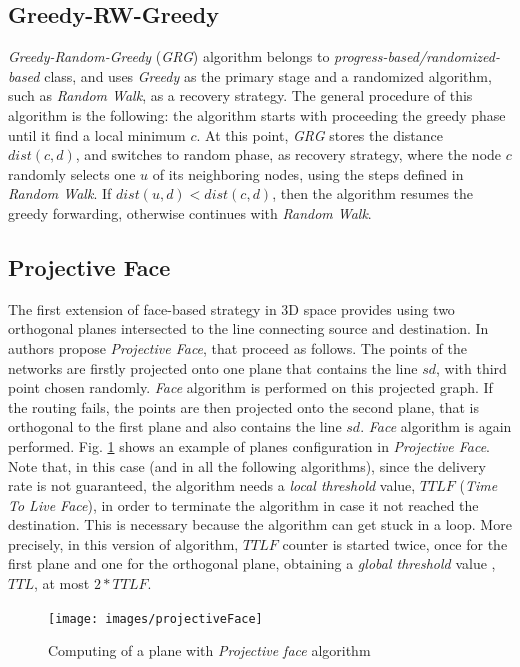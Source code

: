 \documentclass[journal,comsoc]{IEEEtran}
\begin{document}
\subsection{Greedy-RW-Greedy}
\emph{Greedy-Random-Greedy} (\emph{GRG}) algorithm belongs to \emph{progress-based/randomized-based} class, and uses \emph{Greedy} as the primary stage and a randomized algorithm, such as \emph{Random Walk}, as a recovery strategy. The general procedure of this algorithm is the following: the algorithm starts with proceeding the greedy phase until it find a local minimum \(c\). At this point, \emph{GRG} stores the distance \(dist(c, d)\), and switches to random phase, as recovery strategy, where the node \(c\) randomly selects one \(u\) of its neighboring nodes, using the steps defined in \emph{Random Walk}. If \(dist(u, d) < dist(c, d)\), then the algorithm resumes the greedy forwarding, otherwise continues with \emph{Random Walk}.


\subsection{Projective Face}
The first extension of face-based strategy in 3D space provides using two orthogonal planes intersected to the line connecting source and destination. In \cite{kao:3d} authors propose \emph{Projective Face}, that proceed as follows. The points of the networks are firstly projected onto one plane that contains the line \(sd\), with third point chosen randomly. \emph{Face} algorithm is performed on this projected graph. If the routing fails, the points are then projected onto the second plane, that is orthogonal to the first plane and also contains the line \(sd\). \emph{Face} algorithm is again performed. Fig. \ref{fig:projectiveFace} shows an example of planes configuration in \emph{Projective Face}. Note that, in this case (and in all the following algorithms), since the delivery rate is not guaranteed, the algorithm needs a \emph{local threshold} value, \(TTLF\) (\emph{Time To Live Face}), in order to terminate the algorithm in case it not reached the destination. This is necessary because the algorithm can get stuck in a loop. More precisely, in this version of algorithm, \(TTLF\) counter is started twice, once for the first plane and one for the orthogonal plane, obtaining a \emph{global threshold} value ,\(TTL\), at most \(2*TTLF\).

\begin{figure}[!t]
\centering
\texttt{[image: images/projectiveFace]}
\caption{Computing of a plane with \emph{Projective face} algorithm}
  \label{fig:projectiveFace}
\end{figure}
\end{document}
